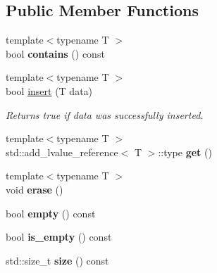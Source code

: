 \subsection*{Public Member Functions}
\begin{DoxyCompactItemize}
\item 
\mbox{\label{classnta_1_1utils_1_1TypeMap_ab2bbbc29b6ad7ad73061d7de57557194}} 
{\footnotesize template$<$typename T $>$ }\\bool {\bfseries contains} () const
\item 
\mbox{\label{classnta_1_1utils_1_1TypeMap_a10d79c0c70a261dfccb725bc2d98ed99}} 
{\footnotesize template$<$typename T $>$ }\\bool \hyperlink{classnta_1_1utils_1_1TypeMap_a10d79c0c70a261dfccb725bc2d98ed99}{insert} (T data)
\begin{DoxyCompactList}\small\item\em Returns true if data was successfully inserted. \end{DoxyCompactList}\item 
\mbox{\label{classnta_1_1utils_1_1TypeMap_aaa03962b8a894a090dfd85fc2ea8cc16}} 
{\footnotesize template$<$typename T $>$ }\\std\+::add\+\_\+lvalue\+\_\+reference$<$ T $>$\+::type {\bfseries get} ()
\item 
\mbox{\label{classnta_1_1utils_1_1TypeMap_a3b7e1aa962f34481bdba3ed9b63471ef}} 
{\footnotesize template$<$typename T $>$ }\\void {\bfseries erase} ()
\item 
\mbox{\label{classnta_1_1utils_1_1TypeMap_a166c9023491a5486f5131e75cbd93ad0}} 
bool {\bfseries empty} () const
\item 
\mbox{\label{classnta_1_1utils_1_1TypeMap_a0f0106415a8b81a7f1c11721e6c231b5}} 
bool {\bfseries is\+\_\+empty} () const
\item 
\mbox{\label{classnta_1_1utils_1_1TypeMap_a196addd1242cf22c3e6f40f3e62173b3}} 
std\+::size\+\_\+t {\bfseries size} () const
\item 

\end{DoxyCompactItemize}
